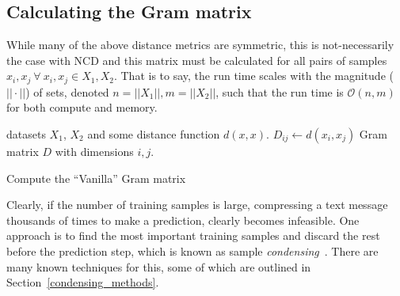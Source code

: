 \documentclass[conference]{IEEEtran}
\begin{document}
\subsection{Calculating the Gram matrix}
\label{gram_matrix}
While many of the above distance metrics are symmetric, this is not-necessarily the case with NCD and this matrix must be calculated for all pairs of samples $x_i, x_j~\forall~x_i,x_j \in X_1, X_2$. 
That is to say, the run time scales with the magnitude ($ || \cdot || $) of sets, denoted $n = || X_1 ||, m = || X_2 ||$, such that the run time is $\mathcal{O}(n,m)$ for both compute and memory.
\begin{algorithm}
    \begin{algorithmic}
        \Require datasets $X_1$, $X_2$ and some distance function $d(x,x)$.
                \State $D_{ij} \gets d(x_i, x_j)$
            \EndFor
        \EndFor
        \State \Return Gram matrix $D$ with dimensions $i,j$.
    \end{algorithmic}
    \caption{Compute the ``Vanilla'' Gram matrix}
    \label{alg:gram}
\end{algorithm}

Clearly, if the number of training samples is large, compressing a text message thousands of times to make a prediction, clearly becomes infeasible. 
One approach is to find the most important training samples and discard the rest before the prediction step, which is known as sample \textit{condensing}~\cite{}.
There are many known techniques for this, some of which are outlined in Section~\ref{condensing_methods}.
\end{document}
